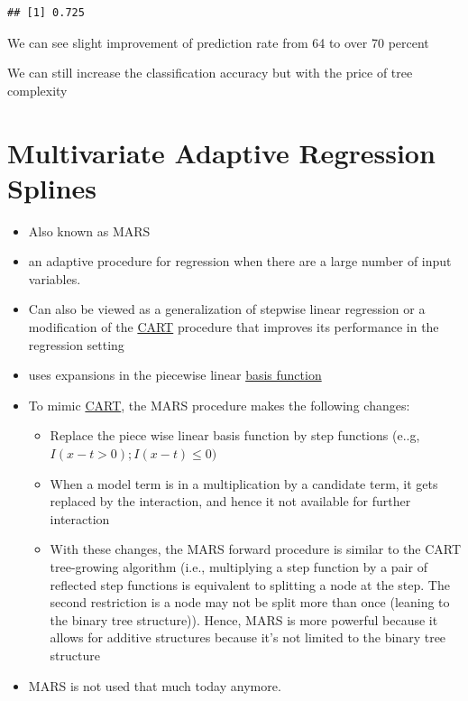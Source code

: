 \documentclass[
]{book}
\begin{document}
\begin{verbatim}
## [1] 0.725
\end{verbatim}

We can see slight improvement of prediction rate from 64 to over 70 percent

We can still increase the classification accuracy but with the price of tree complexity

\hypertarget{multivariate-adaptive-regression-splines}{%
\chapter{Multivariate Adaptive Regression Splines}\label{multivariate-adaptive-regression-splines}}

\begin{itemize}
\item
  Also known as MARS
\item
  an adaptive procedure for regression when there are a large number of input variables.
\item
  Can also be viewed as a generalization of stepwise linear regression or a modification of the \protect\hyperlink{classification-and-regression-trees}{CART} procedure that improves its performance in the regression setting
\item
  uses expansions in the piecewise linear \protect\hyperlink{basis-function-representations}{basis function}
\item
  To mimic \protect\hyperlink{classification-and-regression-trees}{CART}, the MARS procedure makes the following changes:

  \begin{itemize}
  \item
    Replace the piece wise linear basis function by step functions (e..g, \(I(x-t>0); I(x-t) \le 0)\)
  \item
    When a model term is in a multiplication by a candidate term, it gets replaced by the interaction, and hence it not available for further interaction
  \item
    With these changes, the MARS forward procedure is similar to the CART tree-growing algorithm (i.e., multiplying a step function by a pair of reflected step functions is equivalent to splitting a node at the step. The second restriction is a node may not be split more than once (leaning to the binary tree structure)). Hence, MARS is more powerful because it allows for additive structures because it's not limited to the binary tree structure
  \end{itemize}
\item
  MARS is not used that much today anymore.
\end{itemize}
\end{document}
